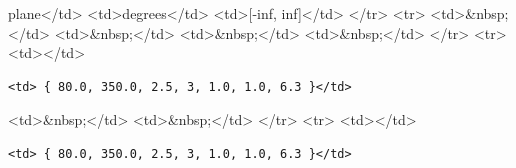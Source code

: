 plane\textless{}/td\textgreater{} \textless{}td\textgreater{}degrees\textless{}/td\textgreater{} \textless{}td\textgreater{}[-inf, inf]\textless{}/td\textgreater{} \textless{}/tr\textgreater{} \textless{}tr\textgreater{} \textless{}td\textgreater{}\&nbsp;\textless{}/td\textgreater{} \textless{}td\textgreater{}\&nbsp;\textless{}/td\textgreater{} \textless{}td\textgreater{}\&nbsp;\textless{}/td\textgreater{} \textless{}td\textgreater{}\&nbsp;\textless{}/td\textgreater{} \textless{}/tr\textgreater{} \textless{}tr\textgreater{} \textless{}td\textgreater{}\textless{}/td\textgreater{}

\begin{verbatim}
<td> { 80.0, 350.0, 2.5, 3, 1.0, 1.0, 6.3 }</td>
\end{verbatim}

\textless{}td\textgreater{}\&nbsp;\textless{}/td\textgreater{} \textless{}td\textgreater{}\&nbsp;\textless{}/td\textgreater{} \textless{}/tr\textgreater{} \textless{}tr\textgreater{} \textless{}td\textgreater{}\textless{}/td\textgreater{}

\begin{verbatim}
<td> { 80.0, 350.0, 2.5, 3, 1.0, 1.0, 6.3 }</td>
\end{verbatim}

